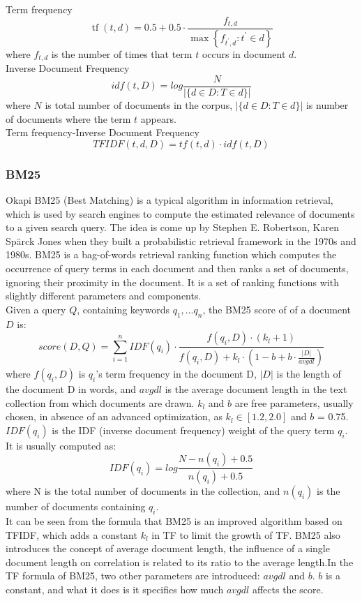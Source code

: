 Term frequency
$$\operatorname{tf}(t, d)=0.5+0.5 \cdot \frac{f_{t, d}}{\max \left\{f_{t^{\prime}, d}: t^{\prime} \in d\right\}}$$
where $f_{t,d}$ is the number of times that term $t$ occurs in document $d$. \\

Inverse Document Frequency
$$ idf(t,D) = log \frac{N}{|\{d \in D:T \in d\}|} $$
where $N$ is total number of documents in the corpus, $|\{d \in D:T \in d\}|$ is number of documents where the term $t$ appears.\\

Term frequency-Inverse Document Frequency
$$TFIDF(t,d,D) = tf(t,d) \cdot idf(t,D)$$	

\subsubsection{BM25}

Okapi BM25 \cite{wikipedia_BM25} (Best Matching) is a typical algorithm in information retrieval, which is used by search engines to compute the estimated relevance of documents to a given search query. The idea is come up by Stephen E. Robertson, Karen Spärck Jones when they built a probabilistic retrieval framework in the 1970s and 1980s.
BM25 is a bag-of-words retrieval ranking function which computes the occurrence of query terms in each document and then ranks a set of documents, ignoring their proximity in the document. It is a set of ranking functions with slightly different parameters and components. \\

Given a query $Q$, containing keywords $q_1,...q_n$, the BM25 score of of a document $D$ is:
$$ score(D,Q) = \sum_{i=1}^{n} IDF(q_i)\cdot \frac{f(q_i,D)\cdot (k_l+1)}{f(q_i,D)+k_l \cdot (1-b+b \cdot \frac{|D|}{avgdl})}$$
where $f(q_i,D)$ is $q_i$'s term frequency in the document D, $|D|$ is the length of the document D in words, and $avgdl$ is the average document length in the text collection from which documents are drawn. $k_l$ and $b$ are free parameters, usually chosen, in absence of an advanced optimization, as $k_l\in [1.2,2.0]$ and $b$ = 0.75. $IDF(q_i)$ is the IDF (inverse document frequency) weight of the query term $q_i$. It is usually computed as:
$$IDF(q_i)=log \frac{N-n(q_i)+0.5}{n(q_i)+0.5}$$
where N is the total number of documents in the collection, and $n(q_i)$ is the number of documents containing $q_i$.\\

It can be seen from the formula that BM25 is an improved algorithm based on TFIDF, which adds a constant $k_l$ in TF to limit the growth of TF. BM25 also introduces the concept of average document length, the influence of a single document length on correlation is related to its ratio to the average length.In the TF formula of BM25, two other parameters are introduced: $avgdl$ and $b$. $b$ is a constant, and what it does is it specifies how much $avgdl$ affects the score.


